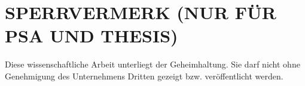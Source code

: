\thispagestyle{empty}

\section*{SPERRVERMERK (NUR FÜR PSA UND THESIS)}
Diese wissenschaftliche Arbeit unterliegt der Geheimhaltung. Sie darf nicht ohne Genehmigung des Unternehmens Dritten gezeigt bzw. veröffentlicht werden.
\vspace*{4em}
\begin{flushleft}
	\makebox[.4\textwidth]{\hrulefill}\hfill \makebox[.4\textwidth]{\hrulefill}\\
	\makebox[.4\textwidth]{\SCMTdatetime}\hfill
	\\
\end{flushleft}
\vspace*{4em}
\begin{flushleft}
	\makebox[.4\textwidth]{\hrulefill}\hfill \makebox[.4\textwidth]{\hrulefill}\\
	\makebox[.4\textwidth]{\SCMTdatetime}\hfill
	\\
\end{flushleft}
\vspace*{4em}
\begin{flushleft}
	\makebox[.4\textwidth]{\hrulefill}\hfill \makebox[.4\textwidth]{\hrulefill}\\
	\makebox[.4\textwidth]{\SCMTdatetime}\hfill
	\\
\end{flushleft}


